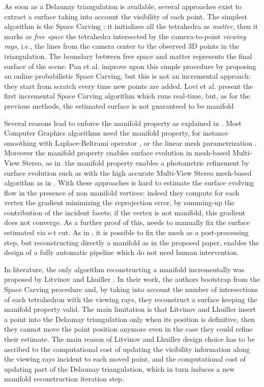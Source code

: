 As soon as a Delaunay triangulation is available, several approaches exist to extract a surface taking into account the visibility of each point. 
The simplest algorithm is the Space Carving \cite{Kutulakos_Seitz05}: it initializes all the tetrahedra as \emph{matter}, then it marks as \emph{free space} the tetrahedra intersected by the camera-to-point \emph{viewing rays}, i.e., the lines from the camera center to the observed 3D points in the triangulation. 
The boundary between free space and matter represents the final surface of the scene.
Pan et al. \cite{Pan_et_al09} improve upon this simple procedure by proposing an online probabilistic Space Carving, but this is not an incremental approach: they start from scratch every time new points are added.
Lovi et al. \cite{Lovi_et_al_11} present the first incremental Space Carving algorithm which runs real-time, but, as for the previous methods, the estimated surface is not guaranteed to be manifold 

Several reasons lead to enforce the manifold property as explained in \cite{lhuillier20152}. 
Most Computer Graphics algorithms need the manifold property, for instance smoothing with Laplace-Beltrami operator \cite{Meyer03}, or the linear mesh parametrization \cite{saboret00}.
Moreover the manifold property enables surface evolution in mesh-based Multi-View Stereo, as in \cite{vu_et_al_2012,delaunoy_et_al_08}.the manifold property enables a photometric refinement by surface evolution such as with the high accurate Multi-View Stereo mesh-based algorithm as in \cite{vu_et_al_2012,delaunoy_et_al_08}.
With these approaches is hard to estimate the surface evolving flow in the presence of non manifold vertices: indeed they compute for each vertex the gradient minimizing the reprojection error, by summing-up the contribution of the incident facets; if the vertex is not manifold, this gradient does not converge. As a further proof of this, \cite{vu_et_al_2012} needs to manually fix the surface estimated via s-t cut.
As in \cite{vu_et_al_2012}, it is possible to fix the mesh as a post-processing step, but reconstructing directly a manifold as in the proposed paper, enables the design of a fully automatic pipeline which do not need human intervention.

In literature, the only algorithm reconstructing a manifold incrementally was proposed by Litvinov and Lhuiller \cite{litvinov_lhuillier_13,litvinov_Lhiuller14}. 
In their work, the authors  bootstrap from the Space Carving procedure and, by taking into account the number of intersections of each tetrahedron with the viewing rays, they reconstruct a surface keeping the manifold property valid. 
The main limitation is that  Litvinov and Lhuiller insert a point into the Delaunay triangulation only when its position is definitive, then they cannot move the point position anymore even in the case they could refine their estimate. 
The main reason of Litvinov and Lhuiller design choice has to be ascribed to the computational cost of updating the visibility information along the viewing rays incident to each moved point, and the computational cost of updating part of the Delaunay triangulation, which in turn induces a new manifold reconstruction iteration step.

